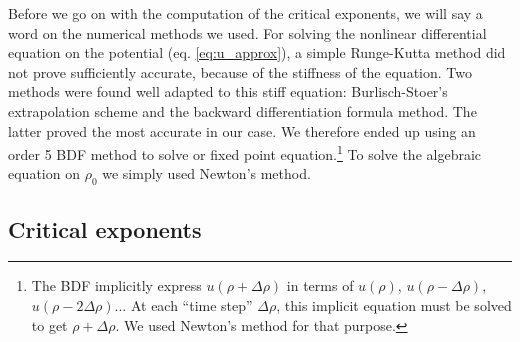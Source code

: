 Before we go on with the computation of the critical exponents, we will say a word on the numerical methods we used. For solving the nonlinear differential equation on the potential (eq. \ref{eq:u_approx}), a simple Runge-Kutta method did not prove sufficiently accurate, because of the stiffness of the equation. Two methods were found well adapted to this stiff equation: Burlisch-Stoer's extrapolation scheme and the backward differentiation formula method. The latter proved the most accurate in our case. We therefore ended up using an order 5 BDF method to solve or fixed point equation.\footnote{The BDF implicitly express $u(\rho + \Delta \rho)$ in terms of $u(\rho)$, $u(\rho - \Delta \rho)$, $u(\rho - 2 \Delta \rho)$... At each ``time step'' $\Delta \rho$, this implicit equation must be solved to get $\rho + \Delta \rho$. We used Newton's method for that purpose.} 
To solve the algebraic equation on $\rho_0$ we simply used Newton's method.

\subsection{Critical exponents}

